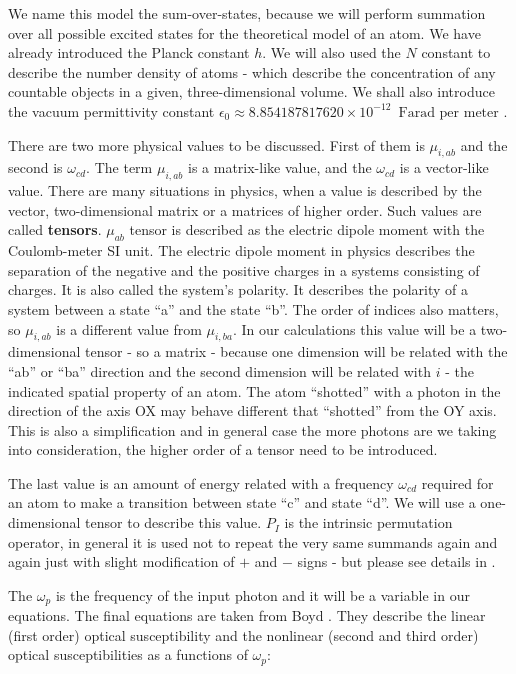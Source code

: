 \documentclass[12pt,twoside,a4paper]{article}
\numberwithin{equation}{subsection}
\numberwithin{figure}{subsection}
\begin{document}
We name this model the sum-over-states, because we will perform summation over all possible excited states for the theoretical model of an atom. We have already introduced the Planck constant $h$. We will also used the $N$ constant to describe the number density of atoms - which describe the concentration of any countable objects in a given, three-dimensional volume. We shall also introduce the vacuum permittivity constant $\epsilon_0 \approx 8.854187817620 \times 10^{-12} \, \text{ Farad per meter } $. 

There are two more physical values to be discussed. First of them is $\mu_{i, ab}$ and the second is $\omega_{cd}$. The term $\mu_{i, ab}$ is a matrix-like value, and the $\omega_{cd}$ is a vector-like value. There are many situations in physics, when a value is described by the vector, two-dimensional matrix or a matrices of higher order. Such values are called \textbf{tensors}. $\mu_{ab}$ tensor is described as the electric dipole moment with the Coulomb-meter SI unit. The electric dipole moment in physics describes the separation of the negative and the positive charges in a systems consisting of charges. It is also called the system's polarity. It describes the polarity of a system between a state ``a'' and the state ``b''. The order of indices also matters, so $\mu_{i, ab}$ is a different value from $\mu_{i, ba}$. In our calculations this value will be a two-dimensional tensor - so a matrix - because one dimension will be related with the ``ab'' or ``ba'' direction and the second dimension will be related with $i$ - the indicated spatial property of an atom. The atom ``shotted'' with a photon in the direction of the axis OX may behave different that ``shotted'' from the OY axis. This is also a simplification and in general case the more photons are we taking into consideration, the higher order of a tensor need to be introduced.

The last value is an amount of energy related with a frequency $\omega_{cd}$ required for an atom to make a transition between state ``c'' and state ``d''. We will use a one-dimensional tensor to describe this value. $P_{I}$ is the intrinsic permutation operator, in general it is used not to repeat the very same summands again and again just with slight modification of $+$ and $-$ signs - but please see details in \cite{boyd_nlo}.

The $\omega_{p}$ is the frequency of the input photon and it will be a variable in our equations. The final equations are taken from Boyd \cite{boyd_nlo}. They describe the linear (first order) optical susceptibility and the nonlinear (second and third order) optical susceptibilities as a functions of $\omega_{p}$:
\end{document}
